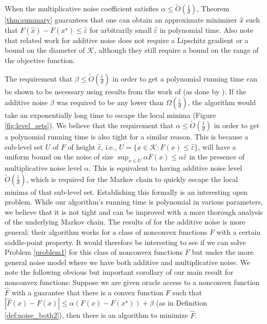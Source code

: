 \documentclass[final,12pt]{colt2018} %
\begin{document}
{\noindent
%
When the multiplicative noise coefficient satisfies $\alpha \leq \tilde{O}(\frac{1}{d})$, Theorem \ref{thm:summary} guarantees that one can obtain an approximate minimizer $\hat{x}$ such that $F(\hat{x})-F(x^{\star}) \leq \hat{\varepsilon}$ for arbitrarily small $\hat{\varepsilon}$ in polynomial  time.  
%
%
Also note that related work \citep{applegate_kannan} for additive noise does not require a Lipschitz gradient or a bound on the diameter of $\mathcal{K}$, although they still require a bound on the range of the objective function.
%


% 
The requirement that $\beta \leq \tilde{O}(\frac{\hat{\varepsilon}}{d})$ in order to get a polynomial running time can be shown to be  necessary using results from the work of \cite{blum1989training} (as done by \cite{hitting_times}).
%
  If the additive noise $\beta$ was required to be any lower than $\Omega(\frac{\hat{\varepsilon}}{d})$, the algorithm would take an exponentially long time to escape the local minima (Figure \ref{fig:level_sets}).
%  
  We believe that the requirement that $\alpha \leq \tilde{O}(\frac{1}{d})$ in order to get a polynomial running time is also tight for a similar reason.  
    This is because a sub-level set $U$ of $F$ of height $\hat{\varepsilon}$, i.e., $U=\{x \in \mathcal{K}: F(x)\leq\hat{\varepsilon}\}$, will have a uniform bound on the noise of size $\sup_{x\in U}\alpha F(x) \leq \alpha \hat{\varepsilon}$ in the presence of multiplicative noise  level $\alpha$.  
  This is equivalent to having additive noise  level $\tilde{O}(\frac{\hat{\varepsilon}}{d})$, which is required for the Markov chain to quickly escape the local minima of that sub-level set.
  Establishing this formally is an interesting open problem.
%
  While our algorithm's running time is polynomial in various parameters, we believe that it is not tight and can be improved with a more thorough analysis of the underlying Markov chain.
%
The results of \cite{hitting_times} for the additive noise  is more general; their algorithm works  for a class of nonconvex functions $F$ with a certain saddle-point property.
%
 It would therefore be interesting to see if we can solve Problem \ref{problem1} for this class of  nonconvex functions $F$ but under the more general noise model where we have both additive and multiplicative noise.
% 
We note the following obvious but important corollary of our main result for nonconvex functions: Suppose we are given oracle access to a nonconvex function $\hat{F}$ with a guarantee that there is a convex function $F$ such that $|\hat{F}(x) - F(x)|\leq \alpha (F(x) - F(x^{\star})) + \beta$ (as in Definition \ref{def:noise_both2}), then there is an algorithm to minimize $\hat{F}$.
%

}
\end{document}
